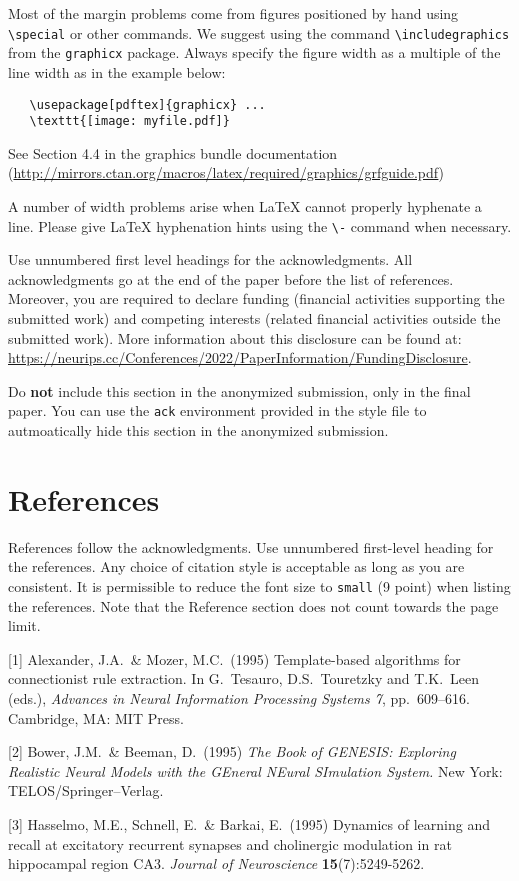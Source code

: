 \documentclass{article}
\begin{document}
Most of the margin problems come from figures positioned by hand using
\verb+\special+ or other commands. We suggest using the command
\verb+\includegraphics+ from the \verb+graphicx+ package. Always specify the
figure width as a multiple of the line width as in the example below:
\begin{verbatim}
   \usepackage[pdftex]{graphicx} ...
   \texttt{[image: myfile.pdf]}
\end{verbatim}
See Section 4.4 in the graphics bundle documentation
(\url{http://mirrors.ctan.org/macros/latex/required/graphics/grfguide.pdf})


A number of width problems arise when \LaTeX{} cannot properly hyphenate a
line. Please give LaTeX hyphenation hints using the \verb+\-+ command when
necessary.


\begin{ack}
Use unnumbered first level headings for the acknowledgments. All acknowledgments
go at the end of the paper before the list of references. Moreover, you are required to declare
funding (financial activities supporting the submitted work) and competing interests (related financial activities outside the submitted work).
More information about this disclosure can be found at: \url{https://neurips.cc/Conferences/2022/PaperInformation/FundingDisclosure}.


Do {\bf not} include this section in the anonymized submission, only in the final paper. You can use the \texttt{ack} environment provided in the style file to autmoatically hide this section in the anonymized submission.
\end{ack}


\section*{References}


References follow the acknowledgments. Use unnumbered first-level heading for
the references. Any choice of citation style is acceptable as long as you are
consistent. It is permissible to reduce the font size to \verb+small+ (9 point)
when listing the references.
Note that the Reference section does not count towards the page limit.
\medskip


{
\small


[1] Alexander, J.A.\ \& Mozer, M.C.\ (1995) Template-based algorithms for
connectionist rule extraction. In G.\ Tesauro, D.S.\ Touretzky and T.K.\ Leen
(eds.), {\it Advances in Neural Information Processing Systems 7},
pp.\ 609--616. Cambridge, MA: MIT Press.


[2] Bower, J.M.\ \& Beeman, D.\ (1995) {\it The Book of GENESIS: Exploring
  Realistic Neural Models with the GEneral NEural SImulation System.}  New York:
TELOS/Springer--Verlag.


[3] Hasselmo, M.E., Schnell, E.\ \& Barkai, E.\ (1995) Dynamics of learning and
recall at excitatory recurrent synapses and cholinergic modulation in rat
hippocampal region CA3. {\it Journal of Neuroscience} {\bf 15}(7):5249-5262.
}
\end{document}
